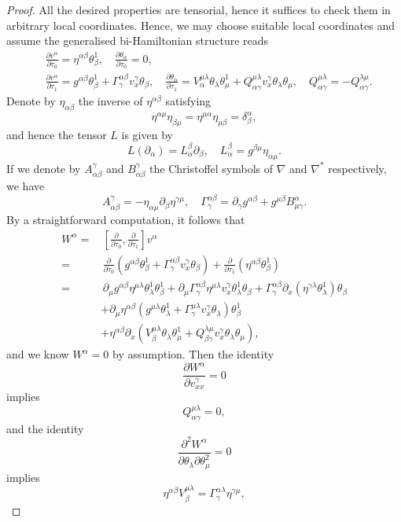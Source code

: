\documentclass[11pt,a4paper]{amsart}
\numberwithin{equation}{section}
\newcommand{\diff}[2]{\frac{\partial #1}{\partial #2}}
\newcommand{\qa}{\alpha}
\newcommand{\qb}{\beta}
\newcommand{\qd}{\delta}
\newcommand{\qg}{\gamma}
\newcommand{\qt}{\tau}
\newcommand{\qth}{\theta}
\newcommand{\qp}{\partial}
\newcommand{\Qg}{\Gamma}
\newcommand{\ql}{\lambda}
\newcommand{\kk}[1]{\left(#1\right)}
\newcommand{\fk}[2]{\left[#1, #2\right]}
\numberwithin{equation}{section}
\begin{document}
\begin{proof}
  All the desired properties are tensorial, hence it suffices to check them in arbitrary local coordinates. Hence, we may choose suitable local coordinates and assume the generalised bi-Hamiltonian structure reads
  \begin{align*}
&\diff{v^\qa}{\qt_0} = \eta^{\qa\qb}\qth_\qb^1,\quad \diff{\qth_\qa}{\qt_0} = 0,\\
&\diff{v^\qa}{\qt_1} = g^{\qa\qb}\qth_\qb^1+\Qg^{\qa\qb}_\qg v^\qg_x\qth_\qb,\quad \diff{\qth_\qa}{\qt_1} = V_\qa^{\mu\ql}\qth_\ql\qth_\mu^1+Q^{\mu\ql}_{\qa\qg}v^\qg_x\qth_\ql\qth_\mu,\quad Q^{\mu\ql}_{\qa\qg}=-Q^{\ql\mu}_{\qa\qg}.
  \end{align*}
  Denote by $\eta_{\qa\qb}$ the inverse of $\eta^{\qa\qb}$ satisfying
  \[
  \eta^{\qa\mu}\eta_{\qb\mu} = \eta^{\mu\qa}\eta_{\mu\qb} = \qd^\qa_\qb,
  \]
  and hence the tensor $L$ is given by 
  \[
  L(\qp_\qa) = L^\qb_\qa\qp_\qb,\quad L^\qb_\qa = g^{\qb\mu}\eta_{\qa\mu}.
  \]
  If we denote by $A^\qg_{\qa\qb}$ and $B^\qg_{\qa\qb}$ the Christoffel symbols of $\nabla$ and $\nabla^*$ respectively, we have 
 \[
    A^\qg_{\qa\qb} = -\eta_{\qa\mu}\qp_\qb\eta^{\qg\mu},\quad \Qg^{\qa\qb}_\qg = \qp_\qg g^{\qa\qb}+g^{\mu\qb}B^\qa_{\mu\qg}.
\]
  By a straightforward computation, it follows that  
  \begin{align*}
    W^\qa =&\, \fk{\diff{}{\qt_0}}{\diff{}{\qt_1}}v^\qa\\
    =&\,\diff{}{\qt_0}\kk{g^{\qa\qb}\qth_\qb^1+\Qg^{\qa\qb}_\qg v^\qg_x\qth_\qb}+\diff{}{\qt_1}\kk{\eta^{\qa\qb}\qth_\qb^1}\\
    =&\,\qp_\mu g^{\qa\qb}\eta^{\mu\ql}\qth_\ql^1\qth_\qb^1+\qp_\mu\Qg^{\qa\qb}_\qg\eta^{\mu\ql}v^\qg_x\qth_\ql^1\qth_\qb+\Qg^{\qa\qb}_\qg\qp_x\kk{\eta^{\qg\ql}\qth_\ql^1}\qth_\qb\\
    &+\qp_\mu\eta^{\qa\qb}\kk{g^{\mu\ql}\qth_\ql^1+\Qg^{\mu\ql}_\qg v^\qg_x\qth_\ql}\qth_\qb^1\\
    &+\eta^{\qa\qb}\qp_x\kk{V_\qb^{\mu\ql}\qth_\ql\qth_\mu^1+Q^{\ql\mu}_{\qb\qg}v^\qg_x\qth_\ql\qth_\mu},
  \end{align*}
  and we know $W^\qa = 0$ by assumption. Then the identity 
  \[
  \diff{W^\qa}{v^\qg_{xx}} = 0
  \]
  implies 
  \[
  Q^{\mu\ql}_{\qa\qg} = 0,
  \]
  and the identity
  \[
  \frac{\qp^2 W^\qa}{\qp \qth_\ql\qp \qth_\mu^2} = 0
  \]
  implies 
  \begin{equation}
    \label{BP}
    \eta^{\qa\qb}V_\qb^{\mu\ql} = \Qg^{\qa\ql}_\qg \eta^{\qg\mu},
  \end{equation}

\end{proof}
\end{document}
